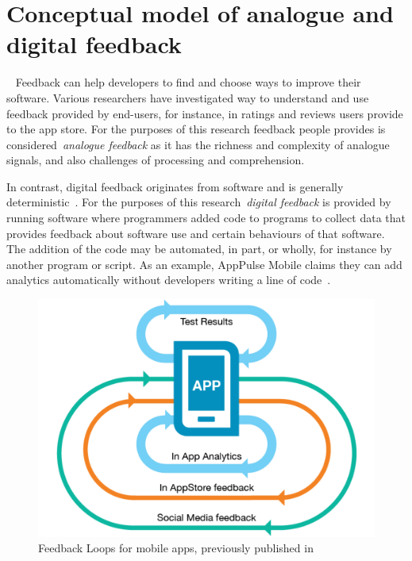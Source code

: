 \section{Conceptual model of analogue and digital feedback}~\label{analogue-and-digital-feedback}
Feedback can help developers to find and choose ways to improve their software. Various researchers have investigated way to understand and use feedback provided by end-users, for instance, in ratings and reviews users provide to the app store. For the purposes of this research feedback people provides is considered~\emph{analogue feedback} as it has the richness and complexity of analogue signals, and also challenges of processing and comprehension.

In contrast, digital feedback originates from software and is generally deterministic~. For the purposes of this research~\emph{digital feedback} is provided by running software where programmers added code to programs to collect data that provides feedback about software use and certain behaviours of that software. The addition of the code may be automated, in part, or wholly, for instance by another program or script. As an example, AppPulse Mobile claims they can add analytics automatically without developers writing a line of code~.

\begin{figure}
    \includegraphics[width=\linewidth]{images/mobile-analytics-playbook/feedback-loops-for-mobile-apps.pdf}
    \caption[Feedback Loops for mobile apps]{Feedback Loops for mobile apps, previously published in~\cite{harty_aymer_playbook_2016}}
    \label{fig:map2015-feedback-loops-for-mobile-apps}
\end{figure}

